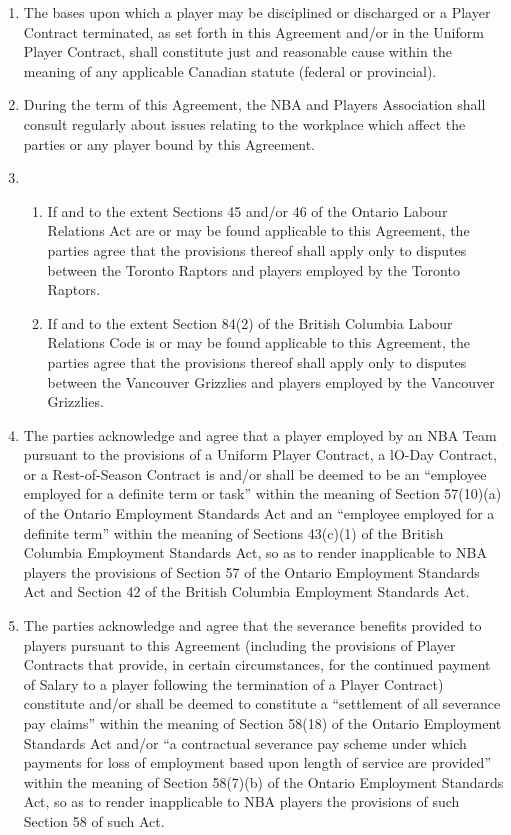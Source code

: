 \documentclass[
]{book}
\providecommand{\tightlist}{%
  \setlength{\itemsep}{0pt}\setlength{\parskip}{0pt}}
\begin{document}
\begin{enumerate}
\def\labelenumi{(\alph{enumi})}
\item
  The bases upon which a player may be disciplined or discharged or a Player Contract terminated, as set forth in this Agreement and/or in the Uniform Player Contract, shall constitute just and reasonable cause within the meaning of any applicable Canadian statute (federal or provincial).
\item
  During the term of this Agreement, the NBA and Players Association shall consult regularly about issues relating to the workplace which affect the parties or any player bound by this Agreement.
\item
  \begin{enumerate}
  \def\labelenumii{(\roman{enumii})}
  \tightlist
  \item
    If and to the extent Sections 45 and/or 46 of the Ontario Labour Relations Act are or may be found applicable to this Agreement, the parties agree that the provisions thereof shall apply only to disputes between the Toronto Raptors and players employed by the Toronto Raptors.
  \item
    If and to the extent Section 84(2) of the British Columbia Labour Relations Code is or may be found applicable to this Agreement, the parties agree that the provisions thereof shall apply only to disputes between the Vancouver Grizzlies and players employed by the Vancouver Grizzlies.
  \end{enumerate}
\item
  The parties acknowledge and agree that a player employed by an NBA Team pursuant to the provisions of a Uniform Player Contract, a lO-Day Contract, or a Rest-of-Season Contract is and/or shall be deemed to be an ``employee employed for a definite term or task'' within the meaning of Section 57(10)(a) of the Ontario Employment Standards Act and an ``employee employed for a definite term'' within the meaning of Sections 43(c)(1) of the British Columbia Employment Standards Act, so as to render inapplicable to NBA players the provisions of Section 57 of the Ontario Employment Standards Act and Section 42 of the British Columbia Employment Standards Act.
\item
  The parties acknowledge and agree that the severance benefits provided to players pursuant to this Agreement (including the provisions of Player Contracts that provide, in certain circumstances, for the continued payment of Salary to a player following the termination of a Player Contract) constitute and/or shall be deemed to constitute a ``settlement of all severance pay claims'' within the meaning of Section 58(18) of the Ontario Employment Standards Act and/or ``a contractual severance pay scheme under which payments for loss of employment based upon length of service are provided'' within the meaning of Section 58(7)(b) of the Ontario Employment Standards Act, so as to render inapplicable to NBA players the provisions of such Section 58 of such Act.

\end{enumerate}
\end{document}
